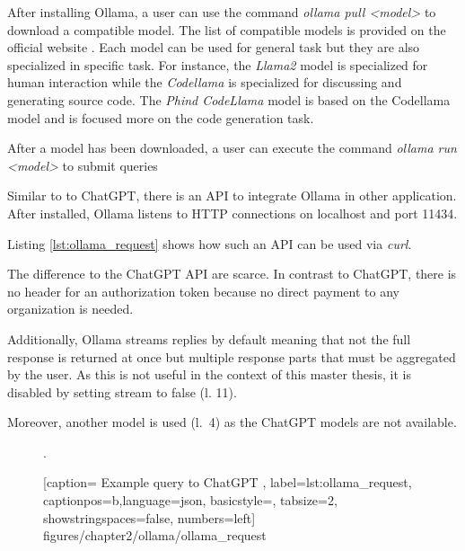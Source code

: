 After installing Ollama, a user can use the command \textit{ollama pull <model>} to download a compatible model. The list of compatible models is provided on the official website \cite{ollama}. Each model can be used for general task but they are also specialized in specific task. For instance, the \textit{Llama2} model is specialized for human interaction while the \textit{Codellama} is specialized for discussing and generating source code. The \textit{Phind CodeLlama} model is based on the Codellama model and is focused more on the code generation task. 

After a model has been downloaded, a user can execute the command \textit{ollama run <model>} to submit queries 

Similar to to ChatGPT, there is an \ac{API} to integrate Ollama in other application. After installed, Ollama listens to \ac{HTTP} connections  on localhost and port 11434.

Listing \ref{lst:ollama_request} shows how such an \ac{API} can be used via \textit{curl}.

The difference to the ChatGPT \ac{API} are scarce. In contrast to ChatGPT, there is no header for an authorization token because no direct payment to any organization is needed. 

Additionally, Ollama streams replies by default meaning that not the full response is returned at once but multiple response parts that must be aggregated by the user. As this is not useful in the context of this master thesis, it is disabled by setting stream to false (l. 11).

Moreover, another model is used (l.~4) as the ChatGPT models are not available. 


 \begin{figure} [htbp!]. 
			
			[caption={ Example query to ChatGPT  \cite{ChatGPT_url}},
			label={lst:ollama_request},
			captionpos=b,language=json, basicstyle=\footnotesize, tabsize=2, showstringspaces=false,  numbers=left]
			{figures/chapter2/ollama/ollama_request}
		\end{figure}